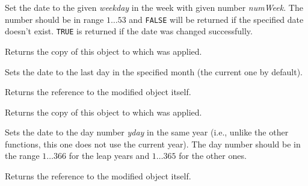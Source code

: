 \label{wxdatetimesettotheweek}


Set the date to the given {\it weekday} in the week with given number
{\it numWeek}. The number should be in range $1\ldots53$ and {\tt FALSE} will
be returned if the specified date doesn't exist. {\tt TRUE} is returned if the
date was changed successfully.

\label{wxdatetimegetweek}


Returns the copy of this object to which
 was applied.

\label{wxdatetimesettolastmonthday}


Sets the date to the last day in the specified month (the current one by
default).

Returns the reference to the modified object itself.

\label{wxdatetimegetlastmonthday}


Returns the copy of this object to which
 was applied.

\label{wxdatetimesettoyearday}


Sets the date to the day number {\it yday} in the same year (i.e., unlike the
other functions, this one does not use the current year). The day number
should be in the range $1\ldots366$ for the leap years and $1\ldots365$ for
the other ones.

Returns the reference to the modified object itself.

\label{wxdatetimegetyearday}


